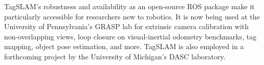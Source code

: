 TagSLAM's robustness and
availability as an open-source ROS \cite{quigley2009} package make it
particularly accessible for researchers new to robotics. It is now
being used at the University of Pennsylvania's GRASP lab for extrinsic camera calibration with
non-overlapping views, loop closure on visual-inertial odometry
benchmarks, tag mapping, object pose estimation, and more. TagSLAM is
also employed in a forthcoming project by the University of Michigan's
DASC laboratory.
